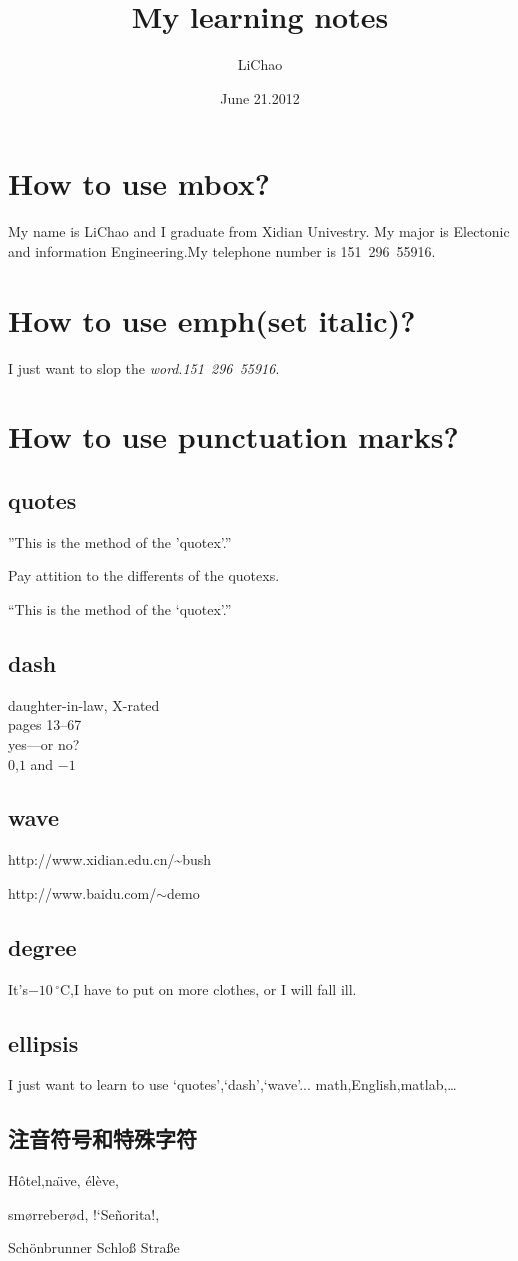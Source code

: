 \documentclass[UTF8]{ctexart}
\title{My learning notes}
\author{LiChao}
\date{June 21.2012}
\begin{document}
\maketitle
\section{How to use mbox?}
My name is LiChao and I graduate from Xidian Univestry. My major is Electonic and information Engineering.My telephone number is \mbox{151 296 55916}. %

\section{How to use emph(set italic)?}
I just want to slop the \emph{word}.\mbox{\emph{151 296 55916}}.

\section{How to use punctuation marks?}
\subsection{quotes}
''This is the method of the 'quotex'.''

Pay attition to the differents of the quotexs.

``This is the method of the `quotex'.''

\subsection{dash}
daughter-in-law, X-rated\\     %

pages 13--67\\                 %

yes---or no?\\                 %

$0$,$1$ and $-1$               %

\subsection{wave}
http://www.xidian.edu.cn/\~{}bush

http://www.baidu.com/$\sim$demo  %

\subsection{degree}
It's$-10\,^{\circ}\mathrm{C}$,I have to put on more clothes, or I will fall ill.  %

\subsection{ellipsis}
I just want to learn to use `quotes',`dash',`wave'...
math,English,matlab,\ldots      %

\subsection{注音符号和特殊字符}
H\^otel,na\"\i ve, \'el\`eve,

sm\o rreber\o d, !`Se\~norita!,

Sch\"onbrunner Schlo\ss{}
Stra\ss e
\end{document}
